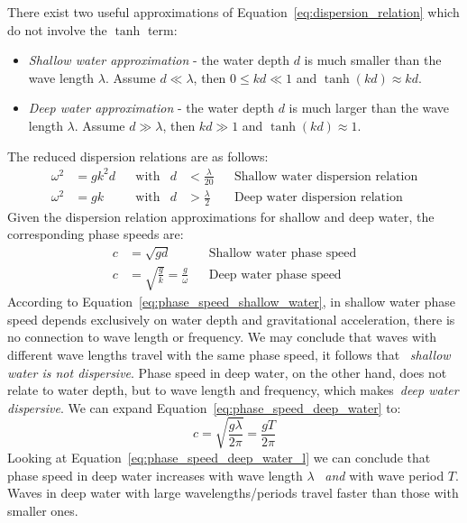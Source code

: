There exist two useful approximations of Equation~\ref{eq:dispersion_relation} which do not involve the $\tanh$ term:
\begin{itemize}
 \item \emph{Shallow water approximation} - the water depth $d$ is much smaller than the wave length $\lambda$.
 Assume $d \ll \lambda$, then $0 \leq kd \ll 1$ and $\tanh(kd) \approx kd$.
 \item \emph{Deep water approximation} - the water depth $d$ is much larger than the wave length $\lambda$.
 Assume $d \gg \lambda$, then $kd \gg 1$ and $\tanh(kd) \approx 1$.
\end{itemize}
%
The reduced dispersion relations are as follows:
\begin{align}
\label{eq:disp_rel_shallow_water}
\omega^2 & = gk^2d && \text{with} & d &< \frac{\lambda}{20}  && \text{Shallow 
water dispersion relation}\\
\label{eq:disp_rel_deep_water}
\omega^2 & = gk    && \text{with} & d &> \frac{\lambda}{2} && \text{Deep water 
dispersion relation}
\end{align}
%
Given the dispersion relation approximations for shallow and deep water, the corresponding
phase speeds are:
\begin{align}
 \label{eq:phase_speed_shallow_water} c &= \sqrt{gd} && \text{Shallow water phase speed}\\
  \label{eq:phase_speed_deep_water}   c &= \sqrt{\frac{g}{k}} = \frac{g}{\omega} && \text{Deep water phase speed}
\end{align}
%
According to Equation~\ref{eq:phase_speed_shallow_water}, in shallow water phase speed depends exclusively
on water depth and gravitational acceleration, there is no connection to wave length or frequency.
We may conclude that waves with different wave lengths travel with the same phase speed, it follows that
~\emph{shallow water is not dispersive}. Phase speed in deep water, on the other hand,
does not relate to water depth, but to wave length and frequency, which makes~\emph{deep water dispersive}.
We can expand Equation~\ref{eq:phase_speed_deep_water} to:
%
\begin{equation}
\label{eq:phase_speed_deep_water_l}
 c = \sqrt{\frac{g\lambda}{2\pi}} = \frac{gT}{2\pi}
\end{equation}
%
Looking at Equation~\ref{eq:phase_speed_deep_water_l} we can conclude that phase speed in deep water increases
with wave length $\lambda$ ~\emph{and} with wave period $T$. Waves in deep water with large wavelengths/periods
travel faster than those with smaller ones.
%
